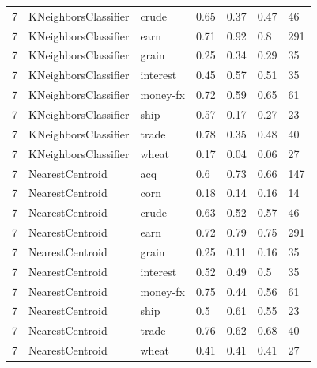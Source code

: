 \documentclass{article}
\begin{document}
\begin{table}[h]
\begin{tabular}{lllllll}
7             & KNeighborsClassifier   & crude           & 0.65               & 0.37            & 0.47              & 46               \\
7             & KNeighborsClassifier   & earn            & 0.71               & 0.92            & 0.8               & 291              \\
7             & KNeighborsClassifier   & grain           & 0.25               & 0.34            & 0.29              & 35               \\
7             & KNeighborsClassifier   & interest        & 0.45               & 0.57            & 0.51              & 35               \\
7             & KNeighborsClassifier   & money-fx        & 0.72               & 0.59            & 0.65              & 61               \\
7             & KNeighborsClassifier   & ship            & 0.57               & 0.17            & 0.27              & 23               \\
7             & KNeighborsClassifier   & trade           & 0.78               & 0.35            & 0.48              & 40               \\
7             & KNeighborsClassifier   & wheat           & 0.17               & 0.04            & 0.06              & 27               \\
7             & NearestCentroid        & acq             & 0.6                & 0.73            & 0.66              & 147              \\
7             & NearestCentroid        & corn            & 0.18               & 0.14            & 0.16              & 14               \\
7             & NearestCentroid        & crude           & 0.63               & 0.52            & 0.57              & 46               \\
7             & NearestCentroid        & earn            & 0.72               & 0.79            & 0.75              & 291              \\
7             & NearestCentroid        & grain           & 0.25               & 0.11            & 0.16              & 35               \\
7             & NearestCentroid        & interest        & 0.52               & 0.49            & 0.5               & 35               \\
7             & NearestCentroid        & money-fx        & 0.75               & 0.44            & 0.56              & 61               \\
7             & NearestCentroid        & ship            & 0.5                & 0.61            & 0.55              & 23               \\
7             & NearestCentroid        & trade           & 0.76               & 0.62            & 0.68              & 40               \\
7             & NearestCentroid        & wheat           & 0.41               & 0.41            & 0.41              & 27               \\\end{tabular}
\end{table}
\end{document}
